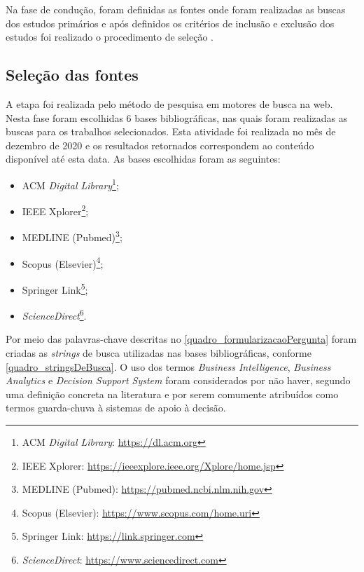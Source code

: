 Na fase de condução, foram definidas as fontes onde foram realizadas as buscas dos estudos primários e após definidos os critérios de inclusão e exclusão dos estudos foi realizado o procedimento de seleção \cite{biolchini2005}. 


\subsection{Seleção das fontes}

A etapa foi realizada pelo método de pesquisa em motores de busca na web. Nesta fase foram escolhidas 6 bases bibliográficas, nas quais foram realizadas as buscas para os trabalhos selecionados. Esta atividade foi realizada no mês de dezembro de 2020 e os resultados retornados correspondem ao conteúdo disponível até esta data. As bases escolhidas foram as seguintes:
\begin{itemize}
 \item ACM \textit{Digital Library}\footnote{ACM \textit{Digital Library}: \url{https://dl.acm.org}};
 \item IEEE Xplorer\footnote{IEEE Xplorer: \url{https://ieeexplore.ieee.org/Xplore/home.jsp}};
 \item MEDLINE (Pubmed)\footnote{MEDLINE (Pubmed): \url{https://pubmed.ncbi.nlm.nih.gov}};
 \item Scopus (Elsevier)\footnote{Scopus (Elsevier): \url{https://www.scopus.com/home.uri}};
 \item Springer Link\footnote{Springer Link: \url{https://link.springer.com}};
 \item \textit{ScienceDirect}\footnote{\textit{ScienceDirect}: \url{https://www.sciencedirect.com}}.
\end{itemize}

Por meio das palavras-chave descritas no \autoref{quadro_formularizacaoPergunta} foram criadas as \textit{strings} de busca utilizadas nas bases bibliográficas, conforme \autoref{quadro_stringsDeBusca}. O uso dos termos \textit{Business Intelligence}, \textit{Business Analytics} e \textit{Decision Support System} foram considerados por não haver, segundo  uma definição concreta na literatura e por serem comumente atribuídos como termos guarda-chuva à sistemas de apoio à decisão. 

